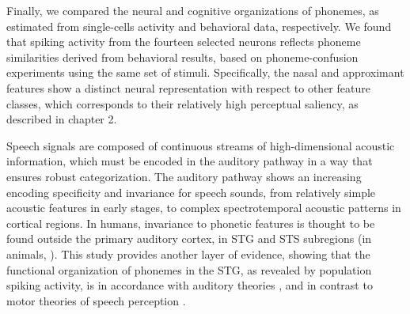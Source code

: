 Finally, we compared the neural and cognitive organizations of phonemes, as estimated from single-cells activity and behavioral data, respectively. We found that spiking activity from the fourteen selected neurons reflects phoneme similarities derived from behavioral results, based on phoneme-confusion experiments using the same set of stimuli. Specifically, the nasal and approximant features show a distinct neural representation with respect to other feature classes, which corresponds to their relatively high perceptual saliency, as described in chapter 2.

Speech signals are composed of continuous streams of high-dimensional acoustic information, which must be encoded in the auditory pathway in a way that ensures robust categorization. The auditory pathway shows an increasing encoding specificity and invariance for speech sounds, from relatively simple acoustic features in early stages, to complex spectrotemporal acoustic patterns in cortical regions. In humans, invariance to phonetic features is thought to be found outside the primary auditory cortex, in STG and STS subregions \citep{Dewitt2012} (in animals, \citealp[see]{mesgarani2008phoneme}). This study provides another layer of evidence, showing that the functional organization of phonemes in the STG, as revealed by population spiking activity, is in accordance with auditory theories \citep{stevens1989quantal, stevens2002toward}, and in contrast to motor theories of speech perception \citep{liberman1985motor, browman1992articulatory}.